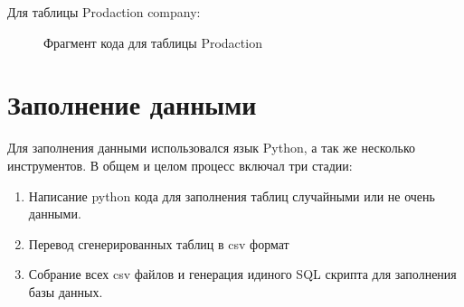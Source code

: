  Для таблицы Prodaction company:
\begin{figure} [H]
    \caption{Фрагмент кода для таблицы Prodaction}
\end{figure}

\section{Заполнение данными}
Для заполнения данными использовался язык Python, а так же несколько инструментов. В общем и целом процесс включал три стадии:

\begin{enumerate}
\item Написание python кода для заполнения таблиц случайными или не очень данными.
\item Перевод сгенерированных таблиц в csv формат
\item Собрание всех csv файлов и генерация идиного SQL скрипта для заполнения базы данных.

\end{enumerate}




